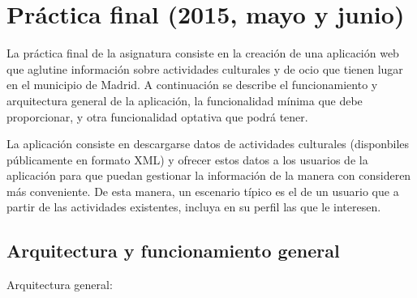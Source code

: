 \newpage

\section{Práctica final (2015, mayo y junio)}
\label{practica-final-2015-05}

La práctica final de la asignatura consiste en la creación de una aplicación web que aglutine información sobre actividades culturales y de ocio que tienen lugar en el municipio de Madrid. A continuación se describe el funcionamiento y arquitectura general de la aplicación, la funcionalidad mínima que debe proporcionar, y otra funcionalidad optativa que podrá tener.

La aplicación consiste en descargarse datos de actividades culturales (disponbiles públicamente en formato XML) y ofrecer estos datos a los usuarios de la aplicación para que puedan gestionar la información de la manera con consideren más conveniente. De esta manera, un escenario típico es el de un usuario que a partir de las actividades existentes, incluya en su perfil las que le interesen.

\subsection{Arquitectura y funcionamiento general}

Arquitectura general:

